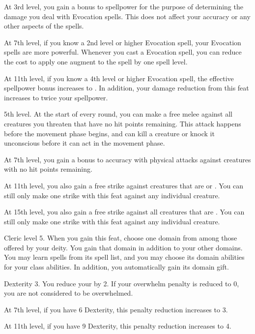     At 3rd level, you gain a  bonus to spellpower for the purpose of determining the damage you deal with Evocation spells.
    This does not affect your accuracy or any other aspects of the spells.

    At 7th level, if you know a 2nd level or higher Evocation spell, your Evocation spells are more powerful.
    Whenever you cast a Evocation spell, you can reduce the cost to apply one augment to the spell by one spell level.

    At 11th level, if you know a 4th level or higher Evocation spell, the effective spellpower bonus increases to .
    In addition, your damage reduction from this feat increases to twice your spellpower.

    \featpres 5th level.
    \featben At the start of every round, you can make a free melee  against all creatures you threaten that have no hit points remaining.
    This attack happens before the movement phase begins, and can kill a creature or knock it unconscious before it can act in the movement phase.

    At 7th level, you gain a  bonus to accuracy with physical attacks against creatures with no hit points remaining.

    At 11th level, you also gain a free strike against creatures that are \helpless or \unaware.
    You can still only make one strike with this feat against any individual creature.

    At 15th level, you also gain a free strike against all creatures that are \bloodied.
    You can still only make one strike with this feat against any individual creature.

    \featpre Cleric level 5.
    \featben When you gain this feat, choose one domain from among those offered by your deity.
    You gain that domain in addition to your other domains.
    You may learn spells from its spell list, and you may choose its domain abilities for your class abilities.
    In addition, you automatically gain its domain gift.

    \featpres Dexterity 3.
    \featben You reduce your  by 2.
    If your overwhelm penalty is reduced to 0, you are not considered to be overwhelmed.

    At 7th level, if you have 6 Dexterity, this penalty reduction increases to 3.

    At 11th level, if you have 9 Dexterity, this penalty reduction increases to 4.

